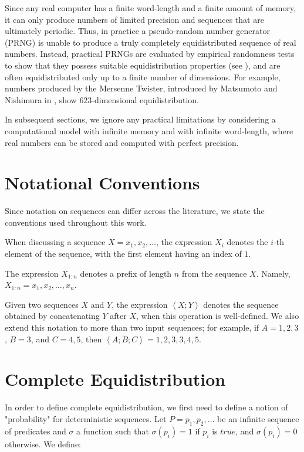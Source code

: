 \documentclass[11pt,a4paper]{tesis}
\theoremstyle{plain}
\theoremstyle{definition}
\begin{document}
Since any real computer has a finite word-length and a finite amount of memory, it can only produce numbers of limited precision and sequences that are ultimately periodic. Thus, in practice a pseudo-random number generator (PRNG) is unable to produce a truly completely equidistributed sequence of real numbers. Instead, practical PRNGs are evaluated by empirical randomness tests to show that they possess suitable equidistribution properties (see \cite{l-ecuyer-2007}), and are often equidistributed only up to a finite number of dimensions. For example, numbers produced by the Mersenne Twister, introduced by Matsumoto and Nishimura in \cite{matsumoto-1998}, show $623$-dimensional equidistribution.

In subsequent sections, we ignore any practical limitations by considering a computational model with infinite memory and with infinite word-length, where real numbers can be stored and computed with perfect precision.

\section{Notational Conventions}

Since notation on sequences can differ across the literature, we state the conventions used throughout this work.

When discussing a sequence $X = x_1, x_2, \dots$, the expression $X_i$ denotes the $i$-th element of the sequence, with the first element having an index of $1$.

The expression $X_{1 : n}$ denotes a prefix of length $n$ from the sequence $X$. Namely, $X_{1 : n} = x_1, x_2, \dots, x_n$.

Given two sequences $X$ and $Y$, the expression $ \left< X ; Y \right>$ denotes the sequence obtained by concatenating $Y$ after $X$, when this operation is well-defined. We also extend this notation to more than two input sequences; for example, if $A = 1, 2, 3$, $B = 3$, and $C = 4, 5$, then $\left< A ; B ; C \right> = 1, 2, 3, 3, 4, 5$.

\section{Complete Equidistribution}

In order to define complete equidistribution, we first need to define a notion of "probability" for deterministic sequences. Let $P = p_1, p_2, ...$ be an infinite sequence of predicates and $\sigma$ a function such that $\sigma(p_i) = 1$ if $p_i$ is $true$, and $\sigma(p_i) = 0$ otherwise. We define:
\end{document}

